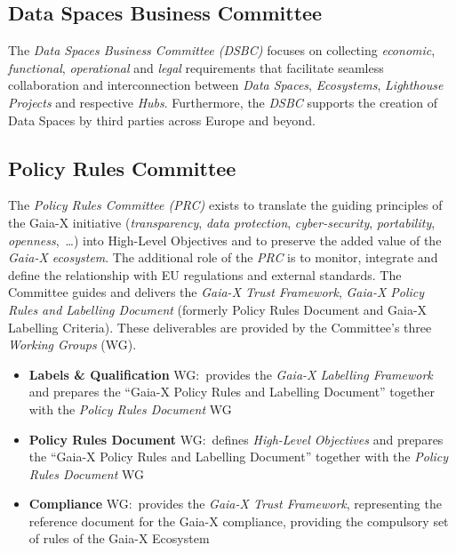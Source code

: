 \subsection{Data Spaces Business Committee}\label{subsec:data-spaces-business-committee}

The \textit{Data Spaces Business Committee (DSBC)} focuses on collecting \textit{economic}, \textit{functional}, \textit{operational} and \textit{legal} requirements that facilitate seamless collaboration and interconnection between \textit{Data Spaces}, \textit{Ecosystems}, \textit{Lighthouse Projects} and respective \textit{Hubs}. %
Furthermore, the \textit{DSBC} supports the creation of Data Spaces by third parties across Europe and beyond.~\cite{gaiax}

\subsection{Policy Rules Committee}\label{subsec:policy-rules-committee}

The \textit{Policy Rules Committee (PRC)} exists to translate the guiding principles of the Gaia-X initiative (\textit{transparency}, \textit{data protection}, \textit{cyber-security}, \textit{portability}, \textit{openness},~\ldots) into High-Level Objectives and to preserve the added value of the \textit{Gaia-X ecosystem}.
The additional role of the \textit{PRC} is to monitor, integrate and define the relationship with EU regulations and external standards.
The Committee guides and delivers the \textit{Gaia-X Trust Framework}, \textit{Gaia-X Policy Rules and Labelling Document} (formerly Policy Rules Document and Gaia-X Labelling Criteria).
These deliverables are provided by the Committee's three \textit{Working Groups} (WG).~\cite{gaiax}
\begin{itemize}
    \item \textbf{Labels \& Qualification} WG:~provides the \textit{Gaia-X Labelling Framework} and prepares the ``Gaia-X Policy Rules and Labelling Document'' together with the \textit{Policy Rules Document} WG
    \item \textbf{Policy Rules Document} WG:~defines \textit{High-Level Objectives} and prepares the ``Gaia-X Policy Rules and Labelling Document'' together with the \textit{Policy Rules Document} WG
    \item \textbf{Compliance} WG:~provides the \textit{Gaia-X Trust Framework}, representing the reference document for the Gaia-X compliance, providing the compulsory set of rules of the Gaia-X Ecosystem
\end{itemize}

